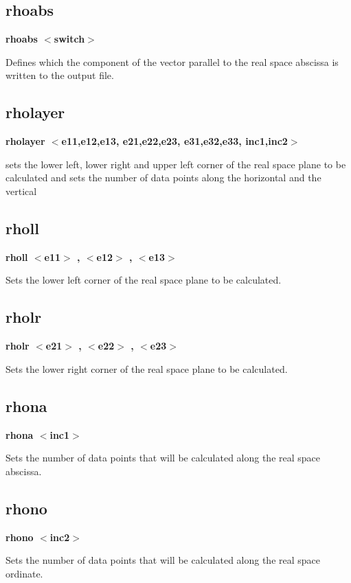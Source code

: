 \subsection*{rhoabs}
{\bf rhoabs $ <$switch$> $ \par }
\par
\vspace{3pt}
Defines which the component of the vector parallel to the 
real space abscissa is written to the output file. 
\subsection*{rholayer}
{\bf rholayer $ <$e11,e12,e13, e21,e22,e23, e31,e32,e33, inc1,inc2$> $ \par }
\par
\vspace{3pt}
sets the lower left, lower right and upper left corner of the 
real space plane to be calculated and sets the number of data 
points along the horizontal and the vertical 
\subsection*{rholl}
{\bf rholl $ <$e11$> $ , $ <$e12$> $ , $ <$e13$> $ \par }
\par
\vspace{3pt}
Sets the lower left corner of the real space plane to be calculated. 
\subsection*{rholr}
{\bf rholr $ <$e21$> $ , $ <$e22$> $ , $ <$e23$> $ \par }
\par
\vspace{3pt}
Sets the lower right corner of the real space plane to be calculated. 
\subsection*{rhona}
{\bf rhona $ <$inc1$> $ \par }
\par
\vspace{3pt}
Sets the number of data points that will be calculated along the 
real space abscissa. 
\subsection*{rhono}
{\bf rhono $ <$inc2$> $ \par }
\par
\vspace{3pt}
Sets the number of data points that will be calculated along the 
real space ordinate. 

